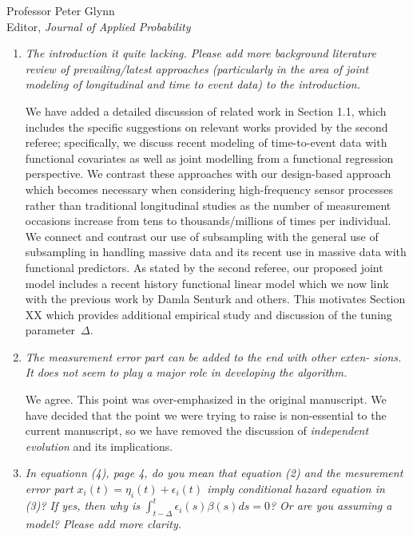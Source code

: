 \documentclass[11pt]{letter} %
\begin{document}
\begin{letter}{Professor
	Peter Glynn\\
	Editor, {\em Journal of Applied Probability}}
\begin{enumerate}
\item {\it The introduction it quite lacking. Please add more background literature review of prevailing/latest approaches (particularly in the area of joint modeling of longitudinal and time to event data) to the introduction.}

\vspace{5mm}
We have added a detailed discussion of related work in Section 1.1, which includes the specific suggestions on relevant works provided by the second referee; specifically, we discuss recent modeling of time-to-event data with functional covariates as well as joint modelling from a functional regression perspective.  We contrast these approaches with our design-based approach which becomes necessary when considering high-frequency sensor processes rather than traditional longitudinal studies as the number of measurement occasions increase from tens to thousands/millions of times per individual.  We connect and contrast our use of subsampling with the general use of subsampling in handling massive data and its recent use in massive data with functional predictors.  As stated by the second referee, our proposed joint model includes a recent history functional linear model which we now link with the previous work by Damla Senturk and others.  This motivates Section XX which provides additional empirical study and discussion of the tuning parameter~$\Delta$.
\vspace{5mm}

\item {\it The measurement error part can be added to the end with other exten-
sions. It does not seem to play a major role in developing the algorithm.}

\vspace{5mm}
We agree.  This point was over-emphasized in the original manuscript. We have decided that the point we were trying to raise is non-essential to the current manuscript, so we have removed the discussion of \emph{independent evolution} and its implications.
\vspace{5mm}

\item {\it In equationn (4), page 4, do you mean that equation (2) and the mesurement error part $x_i (t) = \eta_i (t) + \epsilon_i (t)$ imply conditional hazard equation in (3)?  If yes, then why is $\int_{t-\Delta}^t \epsilon_i (s) \beta(s) ds = 0$?  Or are you assuming a model?  Please add more clarity.}


\end{enumerate}
\end{letter}
\end{document}
